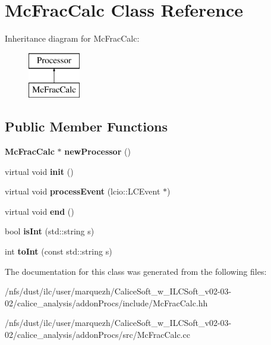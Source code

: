 \section{Mc\-Frac\-Calc Class Reference}
\label{classMcFracCalc}
Inheritance diagram for Mc\-Frac\-Calc\-:\begin{figure}[H]
\begin{center}
\leavevmode
\includegraphics[height=2.000000cm]{classMcFracCalc}
\end{center}
\end{figure}
\subsection*{Public Member Functions}
\begin{DoxyCompactItemize}
\item 
{\bf Mc\-Frac\-Calc} $\ast$ {\bfseries new\-Processor} ()\label{classMcFracCalc_a70794f162a6cd9fa04740d30c1fc3f0b}

\item 
virtual void {\bfseries init} ()\label{classMcFracCalc_a038137333725929837afd82e5a333d03}

\item 
virtual void {\bfseries process\-Event} (lcio\-::\-L\-C\-Event $\ast$)\label{classMcFracCalc_a6f8ee7961e077134c9a9fed8c048bad4}

\item 
virtual void {\bfseries end} ()\label{classMcFracCalc_a0c614a1834dc43652c9f85fe54a7db38}

\item 
bool {\bfseries is\-Int} (std\-::string s)\label{classMcFracCalc_a2bedca9e1b3028460670a9787b8c6f6a}

\item 
int {\bfseries to\-Int} (const std\-::string s)\label{classMcFracCalc_ac0dcbd7322ef2860051f445ec58e8a71}

\end{DoxyCompactItemize}


The documentation for this class was generated from the following files\-:\begin{DoxyCompactItemize}
\item 
/nfs/dust/ilc/user/marquezh/\-Calice\-Soft\-\_\-w\-\_\-\-I\-L\-C\-Soft\-\_\-v02-\/03-\/02/calice\-\_\-analysis/addon\-Procs/include/Mc\-Frac\-Calc.\-hh\item 
/nfs/dust/ilc/user/marquezh/\-Calice\-Soft\-\_\-w\-\_\-\-I\-L\-C\-Soft\-\_\-v02-\/03-\/02/calice\-\_\-analysis/addon\-Procs/src/Mc\-Frac\-Calc.\-cc\end{DoxyCompactItemize}
